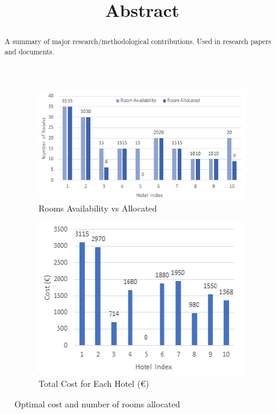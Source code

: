 \documentclass[paper=a4, fontsize=11pt]{scrartcl} %
\begin{document}
\begin{figure}[ht]
\centering
\begin{subfigure}{.5\textwidth}
  \centering
  \includegraphics[scale=0.65]{es1.png}
  \caption{Rooms Availability vs Allocated }
  \label{fig:sub1}
\end{subfigure}%
\begin{subfigure}{.5\textwidth}
  \centering
  \includegraphics[scale=0.65]{es2.png}
  \caption{Total Cost for Each Hotel (\euro)}
  \label{fig:sub2}
\end{subfigure}
\caption{ Optimal cost and number of rooms allocated } 
\label{fig:es}
\end{figure}
\clearpage	

\title{Abstract}
\maketitle
\begin{abstract}
A summary of major research/methodological
contributions. Used in research papers and
documents.
\end{abstract}
\newpage 
\end{document}
